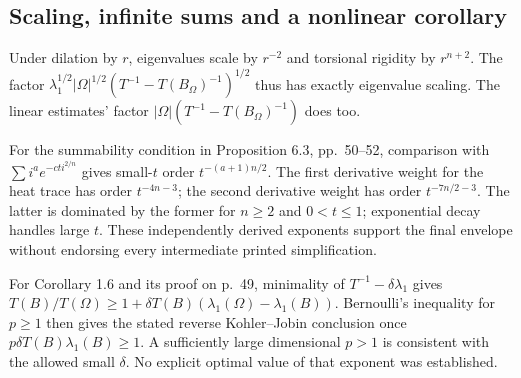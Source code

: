 \documentclass[10pt]{article}
\begin{document}
\subsection*{Scaling, infinite sums and a nonlinear corollary}
Under dilation by \(r\), eigenvalues scale by \(r^{-2}\) and torsional rigidity by \(r^{n+2}\). The factor \(\lambda_1^{1/2}|\Omega|^{1/2}
(T^{-1}-T(B_\Omega)^{-1})^{1/2}\) thus has exactly eigenvalue scaling. The linear estimates’ factor \(|\Omega|(T^{-1}-T(B_\Omega)^{-1})\) does too.\par
For the summability condition in Proposition 6.3, pp. 50–52, comparison with \(\sum i^a e^{-cti^{2/n}}\) gives small-\(t\) order \(t^{-(a+1)n/2}\). The first derivative weight for the heat trace has order \(t^{-4n-3}\); the second derivative weight has order \(t^{-7n/2-3}\). The latter is dominated by the former for \(n\geq2\) and \(0<t\leq1\); exponential decay handles large \(t\). These independently derived exponents support the final envelope without endorsing every intermediate printed simplification.\par
For Corollary 1.6 and its proof on p. 49, minimality of \(T^{-1}-\delta\lambda_1\) gives \(T(B)/T(\Omega)\geq1+\delta T(B)(\lambda_1(\Omega)-\lambda_1(B))\). Bernoulli’s inequality for \(p\geq1\) then gives the stated reverse Kohler–Jobin conclusion once \(p\delta T(B)\lambda_1(B)\geq1\). A sufficiently large dimensional \(p>1\) is consistent with the allowed small \(\delta\). No explicit optimal value of that exponent was established.\par
\end{document}
